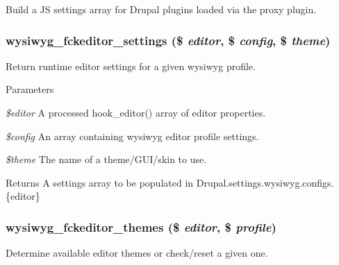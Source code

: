 \label{fckeditor_8inc_a6a13c730790d46d1dfd2f9e5840f4617}
Build a JS settings array for Drupal plugins loaded via the proxy plugin. \hypertarget{fckeditor_8inc_aa8f803e4342076c84b4c091282837ea0}{
\subsubsection[{wysiwyg\_\-fckeditor\_\-settings}]{\setlength{\rightskip}{0pt plus 5cm}wysiwyg\_\-fckeditor\_\-settings (\$ {\em editor}, \/  \$ {\em config}, \/  \$ {\em theme})}}
\label{fckeditor_8inc_aa8f803e4342076c84b4c091282837ea0}
Return runtime editor settings for a given wysiwyg profile.


\begin{DoxyParams}{Parameters}
\item[{\em \$editor}]A processed hook\_\-editor() array of editor properties. \item[{\em \$config}]An array containing wysiwyg editor profile settings. \item[{\em \$theme}]The name of a theme/GUI/skin to use.\end{DoxyParams}
\begin{DoxyReturn}{Returns}
A settings array to be populated in Drupal.settings.wysiwyg.configs.\{editor\} 
\end{DoxyReturn}
\hypertarget{fckeditor_8inc_a6549e60ed414a5048679bd626ea3fbeb}{
\subsubsection[{wysiwyg\_\-fckeditor\_\-themes}]{\setlength{\rightskip}{0pt plus 5cm}wysiwyg\_\-fckeditor\_\-themes (\$ {\em editor}, \/  \$ {\em profile})}}
\label{fckeditor_8inc_a6549e60ed414a5048679bd626ea3fbeb}
Determine available editor themes or check/reset a given one.


